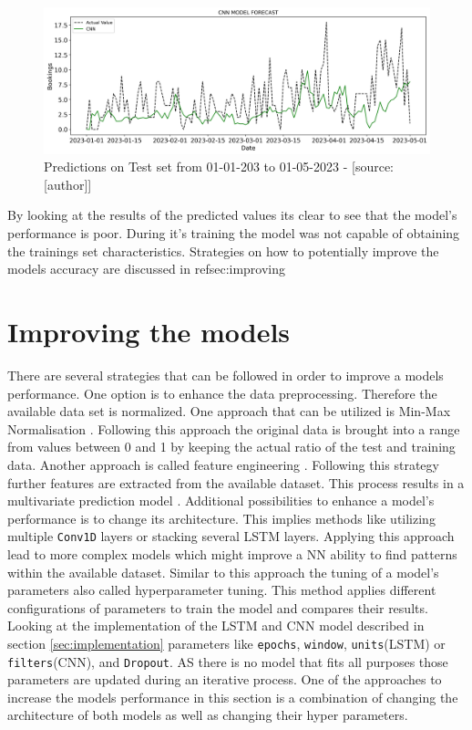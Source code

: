 \begin{figure}[H]
	\centering
		\includegraphics[width=14cm]{images/cnn_1_prediction}
	\caption{Predictions on Test set from 01-01-203 to 01-05-2023 - [source:[author]]}
	\label{fig:lstm_1_training_test}
\end{figure}
By looking at the results of the predicted values its clear to see that the model's performance is poor. During it's training the model was not capable of obtaining the trainings set characteristics. Strategies on how to potentially improve the models accuracy are discussed in ref{sec:improving} 

\section{Improving the models}
\label{sec:improving}
There are several strategies that can be followed in order to improve a models performance. One option is to enhance the data preprocessing. Therefore the available data set is normalized. One approach that can be utilized is Min-Max Normalisation \cite{min_max}. Following this approach the original data is brought into a range from values between 0 and 1 by keeping the actual ratio of the test and training data. 
Another approach is called feature engineering \cite{feature_eng}. Following this strategy further features are extracted from the available dataset. This process results in a multivariate prediction model \cite{multi}.
Additional possibilities to enhance a model's performance is to change its architecture. This implies methods like utilizing multiple \verb|Conv1D| layers or stacking several LSTM layers. Applying this approach lead to more complex models which might improve a NN ability to find patterns within the available dataset. Similar to this approach the tuning of a model's parameters also called hyperparameter tuning.  This method applies different configurations of parameters to train the model and compares their results. Looking at the implementation of the LSTM  and CNN model described in section \ref{sec:implementation} parameters like \verb|epochs|, \verb|window|, \verb|units|(LSTM) or \verb|filters|(CNN), and \verb|Dropout|. AS there is no model that fits all purposes those parameters are updated during an iterative process. \newline
One of the approaches to increase the models performance in this section is a combination of changing the architecture of both models as well as changing their hyper parameters. 

